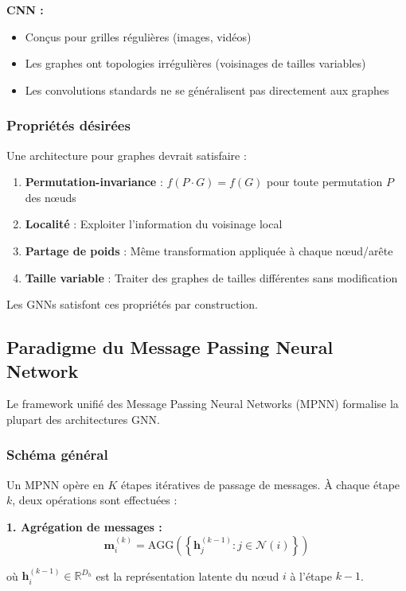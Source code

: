 \textbf{CNN :}
\begin{itemize}
    \item Conçus pour grilles régulières (images, vidéos)
    \item Les graphes ont topologies irrégulières (voisinages de tailles variables)
    \item Les convolutions standards ne se généralisent pas directement aux graphes
\end{itemize}

\subsubsection{Propriétés désirées}

Une architecture pour graphes devrait satisfaire :
\begin{enumerate}
    \item \textbf{Permutation-invariance} : $f(P \cdot G) = f(G)$ pour toute permutation $P$ des nœuds
    \item \textbf{Localité} : Exploiter l'information du voisinage local
    \item \textbf{Partage de poids} : Même transformation appliquée à chaque nœud/arête
    \item \textbf{Taille variable} : Traiter des graphes de tailles différentes sans modification
\end{enumerate}

Les GNNs satisfont ces propriétés par construction.

\subsection{Paradigme du Message Passing Neural Network}

Le framework unifié des Message Passing Neural Networks (MPNN) formalise la plupart des architectures GNN.

\subsubsection{Schéma général}

Un MPNN opère en $K$ étapes itératives de passage de messages. À chaque étape $k$, deux opérations sont effectuées :

\textbf{1. Agrégation de messages :}
\[
\mathbf{m}_i^{(k)} = \text{AGG}\left(\left\{\mathbf{h}_j^{(k-1)} : j \in \mathcal{N}(i)\right\}\right)
\]

où $\mathbf{h}_i^{(k-1)} \in \mathbb{R}^{D_h}$ est la représentation latente du nœud $i$ à l'étape $k-1$.


